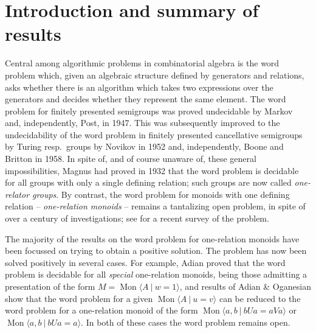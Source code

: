 \documentclass{amsart}
\newcommand{\Mpres}[2]{\operatorname{Mon}\bigl\langle #1\:|\:#2 \bigr\rangle}
\theoremstyle{plain}
\theoremstyle{definition}
\begin{document}
\section{Introduction and summary of results}
Central among algorithmic problems in combinatorial algebra is the word problem which, given an algebraic structure defined by generators and relations, asks whether there is an algorithm which takes two expressions over the generators and decides whether they represent the same element. The word problem for finitely presented semigroups was proved undecidable by Markov and, independently, Post, in 1947. This was subsequently improved to the undecidability of the word problem in finitely presented cancellative semigroups by Turing \cite{Turing1950} resp.\ groups by Novikov in 1952 and, independently, Boone and Britton in 1958. In spite of, and of course unaware of, these general impossibilities, Magnus \cite{Magnus1932} had proved in 1932 that the word problem is decidable for all groups with only a single defining relation; such groups are now called \textit{one-relator groups}. By contrast, the word problem for monoids with one defining relation -- \textit{one-relation monoids} -- remains a tantalizing open problem, in spite of over a century of investigations; see \cite{NybergBrodda2021a} for a recent survey of the problem.

The majority of the results on the word problem for one-relation monoids have been focussed on trying to obtain a positive solution. The problem has now been solved positively in several cases. For example, Adian \cite{Adian1966} proved that the word problem is decidable for all \textit{special} one-relation monoids, being those admitting a presentation of the form $M = \Mpres{A}{w=1}$, and results of Adian \& Oganesian \cite{Adian1978, Adian1987} 
show that the word problem for a given $\Mpres{A}{u = v}$ can be reduced to the word problem for a one-relation monoid of the form  
$\Mpres{a,b}{bUa = aV a}$ or $\Mpres{a,b}{bUa = a}$. 
In both of these cases the word problem remains open. 
\end{document}
